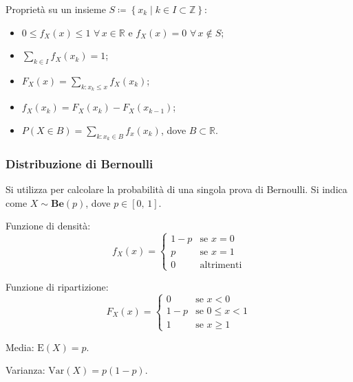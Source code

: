 \documentclass{article}
\theoremstyle{definition}
\newcommand{\R}{\mathbb{R}}
\newcommand{\Z}{\mathbb{Z}}
\newcommand{\E}{\text{E}}
\newcommand{\Var}{\text{Var}}
\begin{document}
            Proprietà su un insieme \(S \coloneqq \left\{x_k \; | \; k \in I \subset \Z\right\}\):
            \begin{itemize}
                \item \(0 \leqslant f_X (x) \leqslant 1\) \(\forall \, x \in \R\) e \(f_X (x) = 0\) \(\forall \, x \not\in S\);
                \item \(\sum_{k \in I} f_X (x_k) = 1\);
                \item \(F_X (x) = \sum_{k : x_k \leqslant x} f_X (x_k)\);
                \item \(f_X (x_k) = F_X (x_k) - F_X (x_{k - 1})\);
                \item \(P (X \in B) = \sum_{k : x_k \in B} f_x (x_k)\), dove \(B \subset \R\).
            \end{itemize}

            \subsubsection{Distribuzione di Bernoulli}

                Si utilizza per calcolare la probabilità di una singola prova di Bernoulli. Si indica come \(X \sim \mathbf{Be}(p)\),
                dove \(p \in [0, \, 1]\).

                Funzione di densità:
                \[
                    f_X (x) =
                        \begin{cases}
                            1 - p & \text{se } x = 0\\
                            p & \text{se } x = 1\\
                            0 & \text{altrimenti}
                        \end{cases}
                \]

                Funzione di ripartizione:
                \[
                    F_X (x) =
                        \begin{cases}
                            0 & \text{se } x < 0\\
                            1 - p & \text{se } 0 \leqslant x < 1\\
                            1 & \text{se } x \geqslant 1
                        \end{cases}
                \]

                Media: \(\E(X) = p\).

                Varianza: \(\Var(X) = p (1 - p)\).
\end{document}
